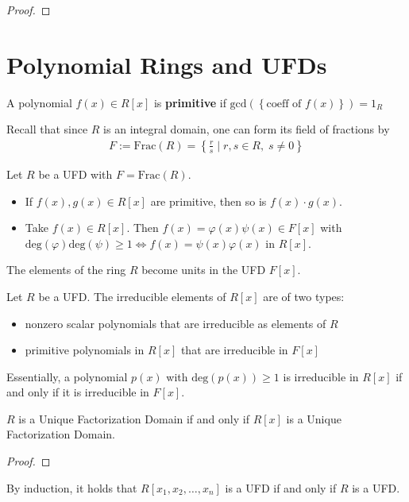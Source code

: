 \documentclass{memoir}
\begin{document}
\begin{proof}
	
\end{proof}

\section{Polynomial Rings and UFDs}
\label{sec:polynomial_rings_and_ufds}


\begin{defn}[Primitive]
	A polynomial \(f(x) \in R[x]\) is \textbf{primitive} if \( \textrm{gcd}(\left\{ \text{coeff of }f(x) \right\} ) = 1_R\)
\end{defn}
Recall that since \(R\) is an integral domain, one can form its field of fractions by
\begin{align*}
	F:= \textrm{Frac}(R) = \left\{ \frac{r}{s} \mid r,s \in R, \; s \neq 0 \right\} 
\end{align*}
\begin{lemma}
	Let \(R\) be a UFD with \(F = \textrm{Frac}(R)\).
	\begin{itemize}
		\item If \(f(x),g(x) \in R[x]\) are primitive, then so is \(f(x)\cdot g(x)\).
		\item Take \(f(x) \in R[x]\). Then \(f(x) = \varphi(x) \psi(x) \in F[x]\) with \( \textrm{deg}(\varphi) \textrm{deg}(\psi)\geq 1 \iff f(x) = \psi(x) \varphi(x)\) in \(R[x]\).
	\end{itemize}
\end{lemma}
The elements of the ring \(R\) become units in the UFD \(F[x]\).


\begin{cor}
	Let \(R\) be a UFD. The irreducible elements of \(R[x]\) are of two types:
	\begin{itemize}
		\item nonzero scalar polynomials that are irreducible as elements of \(R\) 
		\item primitive polynomials in \(R[x]\) that are irreducible in \(F[x]\)
	\end{itemize}
\end{cor}
Essentially, a polynomial \(p(x)\) with \(\textrm{deg}(p(x))\geq 1\) is irreducible in \(R[x]\) if and only if it is irreducible in \(F[x]\).

\begin{thm}
	\(R\) is a Unique Factorization Domain if and only if \(R[x]\) is a Unique Factorization Domain.
\end{thm}
\begin{proof}
	
\end{proof}
By induction, it holds that \(R[x_1,x_2,\ldots,x_n]\) is a UFD if and only if \(R\) is a UFD.
\end{document}
